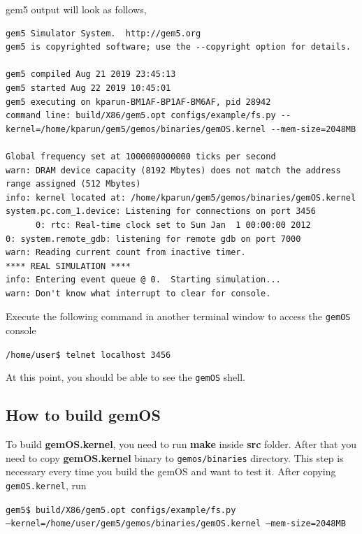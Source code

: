 \documentclass[12pt]{article}
\begin{document}
{\vspace{0.25cm}
\noindent
gem5 output will look as follows,
\begin{scriptsize}
\begin{verbatim}
gem5 Simulator System.  http://gem5.org
gem5 is copyrighted software; use the --copyright option for details.

gem5 compiled Aug 21 2019 23:45:13
gem5 started Aug 22 2019 10:45:01
gem5 executing on kparun-BM1AF-BP1AF-BM6AF, pid 28942
command line: build/X86/gem5.opt configs/example/fs.py --kernel=/home/kparun/gem5/gemos/binaries/gemOS.kernel --mem-size=2048MB

Global frequency set at 1000000000000 ticks per second
warn: DRAM device capacity (8192 Mbytes) does not match the address range assigned (512 Mbytes)
info: kernel located at: /home/kparun/gem5/gemos/binaries/gemOS.kernel
system.pc.com_1.device: Listening for connections on port 3456
      0: rtc: Real-time clock set to Sun Jan  1 00:00:00 2012
0: system.remote_gdb: listening for remote gdb on port 7000
warn: Reading current count from inactive timer.
**** REAL SIMULATION ****
info: Entering event queue @ 0.  Starting simulation...
warn: Don't know what interrupt to clear for console.
\end{verbatim} 
\end{scriptsize}
\noindent
Execute the following command in another terminal window to access the \texttt{gemOS} console 

\vspace{0.25cm}
\noindent
\texttt{/home/user\$ telnet localhost 3456}


\vspace{0.25cm}
\noindent
At this point, you should be able to see the \texttt{gemOS} shell. 

\subsection{How to build gemOS}

To build \textbf{gemOS.kernel}, you need to run \textbf{make} inside \textbf{src} folder. 
After that you need to copy \textbf{gemOS.kernel} binary to \texttt{gemos/binaries} directory. 
This step is necessary every time you build the gemOS and want to test it.
After copying \texttt{gemOS.kernel}, run\\ \newline

\vspace{0.25cm}
\noindent
\texttt{gem5\$ build/X86/gem5.opt configs/example/fs.py} \\ {\tt --kernel=/home/user/gem5/gemos/binaries/gemOS.kernel --mem-size=2048MB}
\vspace{0.25cm}

}
\end{document}
